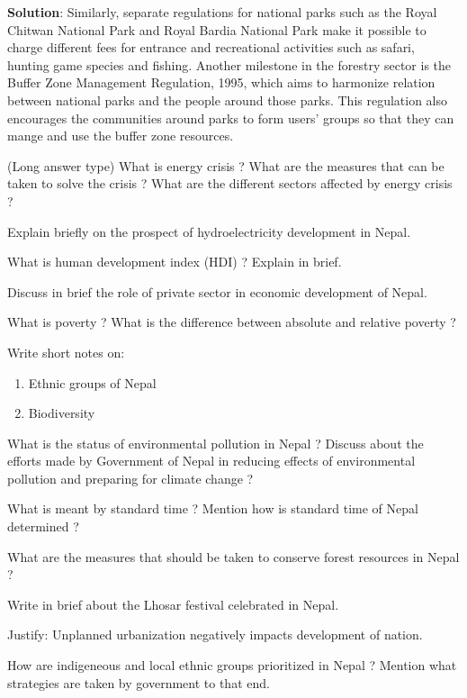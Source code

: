 \documentclass[
]{book}
\newcommand{\question}{\item}
\newenvironment{solution}{ {\bfseries Solution}:}{}
\begin{document}
\begin{questions}
\begin{solution}
Similarly, separate regulations for national parks such as the Royal Chitwan National Park and Royal Bardia National Park make it possible to charge different fees for entrance and recreational activities such as safari, hunting game species and fishing. Another milestone in the forestry sector is the Buffer Zone Management Regulation, 1995, which aims to harmonize relation between national parks and the people around those parks. This regulation also encourages the communities around parks to form users' groups so that they can mange and use the buffer zone resources.

\end{solution}

\question (Long answer type) What is energy crisis ? What are the measures that can be taken to solve the crisis ? What are the different sectors affected by energy crisis ?

\question Explain briefly on the prospect of hydroelectricity development in Nepal.

\question What is human development index (HDI) ? Explain in brief.

\question Discuss in brief the role of private sector in economic development of Nepal. 

\question What is poverty ? What is the difference between absolute and relative poverty ?

\question Write short notes on:

\begin{enumerate}[label=(\roman*)]
\item Ethnic groups of Nepal
\item Biodiversity
\end{enumerate}

\question What is the status of environmental pollution in Nepal ? Discuss about the efforts made by Government of Nepal in reducing effects of environmental pollution and preparing for climate change ?

\question What is meant by standard time ? Mention how is standard time of Nepal determined ?

\question What are the measures that should be taken to conserve forest resources in Nepal ?

\question Write in brief about the Lhosar festival celebrated in Nepal.

\question Justify: Unplanned urbanization negatively impacts development of nation.

\question How are indigeneous and local ethnic groups prioritized in Nepal ? Mention what strategies are taken by government to that end.


\end{questions}
\end{document}
